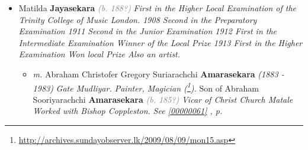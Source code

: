 \documentclass[10pt, openany]{book}
\begin{document}
\begin{itemize}
{\begin{itemize}
{\begin{itemize}
{\begin{itemize}
{\begin{itemize}
{\begin{itemize}
{\begin{itemize}
{\begin{itemize}
{ }
\item{UNKNOWN \textbf{Jayakodi} \textcolor{gray}{\textit{(b. 199?)}}
 }
\item{Twin \textbf{Jayakodi} \textcolor{gray}{\textit{(b. 199?)}}
 }
\end{itemize}}
\end{itemize}
 }
\item{Gamini \textbf{Wijasekara} \textcolor{gray}{\textit{(b. 196?)}} \textcolor{slmaroon}{\textit{Doctor.
General Paediatrician General Secretary of the UNP. Assasinated on the 28th of October 1994 along with Gamini Dissanayake.}}
\begin{itemize}
\item{\textit{m.} Daisy \textbf{Unknown} \textcolor{gray}{\textit{(b. 196?)}}   \label{couple:00000868:00000985} \begin{itemize}
\item{Dumesh \textbf{Wijasekara} \textcolor{gray}{\textit{(b. 199?)}}
 }
\item{Padmini \textbf{Wijasekara} \textcolor{gray}{\textit{(b. 199?)}}
 }
\end{itemize}}
\end{itemize}
 }
\end{itemize}}
\end{itemize}
 }
\end{itemize}}
\end{itemize}
  }
\item{Matilda \textbf{Jayasekara} \textcolor{gray}{\textit{(b. 188?)}} \textcolor{slmaroon}{\textit{First in the Higher Local Examination of the Trinity College of Music London. 1908 Second in the Preparatory Examination 1911 Second in the Junior Examination 1912 First in the Intermediate Examination Winner of the Local Prize 1913 First in the Higher Examination Won local Prize Also an artist.}}
\begin{itemize}
\item{\textit{m.} Abraham Christofer Gregory Suriarachchi \textbf{Amarasekara} \textcolor{slorange}{\textit{(1883 - 1983)}} \textcolor{slmaroon}{\textit{Gate Mudliyar.
Painter, Magician (\footnote{\url{http://archives.sundayobserver.lk/2009/08/09/mon15.asp}}).}} Son of  Abraham Sooriyarachchi \textbf{Amarasekara} \textcolor{gray}{\textit{(b. 185?)}} \textcolor{slmaroon}{\textit{Vicar of Christ Church Matale Worked with Bishop Coppleston.}} \textcolor{slteal}{\textit{See  \autoref{00000061} \textit{, p. \pageref{00000061} }}}   \label{couple:00000059:00000305} \begin{itemize}

\end{itemize}}
\end{itemize}}
\end{itemize}}
\end{itemize}
\end{document}
